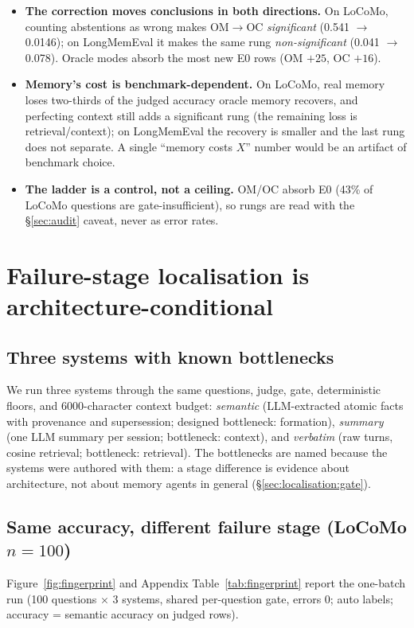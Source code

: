 \documentclass[11pt]{article}
\begin{document}
\begin{itemize}
\item \textbf{The correction moves conclusions in both directions.} On LoCoMo,
counting abstentions as wrong makes OM$\to$OC \emph{significant}
(0.541 $\to$ 0.0146); on LongMemEval it makes the same rung
\emph{non-significant} (0.041 $\to$ 0.078). Oracle modes absorb the most new
E0 rows (OM $+25$, OC $+16$).
\item \textbf{Memory's cost is benchmark-dependent.} On LoCoMo, real memory
loses two-thirds of the judged accuracy oracle memory recovers, and perfecting
context still adds a significant rung (the remaining loss is
retrieval/context); on LongMemEval the recovery is smaller and the last rung
does not separate. A single ``memory costs $X$'' number would be an artifact
of benchmark choice.
\item \textbf{The ladder is a control, not a ceiling.} OM/OC absorb E0 (43\% of
LoCoMo questions are gate-insufficient), so rungs are read with the
\S\ref{sec:audit} caveat, never as error rates.
\end{itemize}

\section{Failure-stage localisation is architecture-conditional}
\label{sec:localisation}

\subsection{Three systems with known bottlenecks}

We run three systems through the same questions, judge, gate, deterministic
floors, and 6000-character context budget: \emph{semantic} (LLM-extracted
atomic facts with provenance and supersession; designed bottleneck:
formation), \emph{summary} (one LLM summary per session; bottleneck: context),
and \emph{verbatim} (raw turns, cosine retrieval; bottleneck: retrieval). The
bottlenecks are named because the systems were authored with them: a stage
difference is evidence about architecture, not about memory agents in general
(\S\ref{sec:localisation:gate}).

\subsection{Same accuracy, different failure stage (LoCoMo $n = 100$)}

Figure~\ref{fig:fingerprint} and Appendix Table~\ref{tab:fingerprint} report
the one-batch run (100 questions $\times$ 3 systems, shared per-question gate,
errors 0; auto labels; accuracy = semantic accuracy on judged rows).
\end{document}
